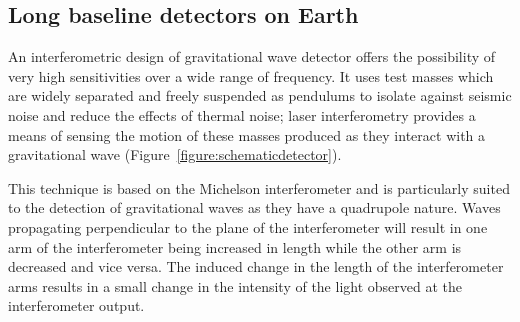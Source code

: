 \documentclass{article}
\begin{document}
\subsection{Long baseline detectors on Earth}
\label{subsection:earth}

An interferometric design of gravitational wave detector offers the possibility
of very high sensitivities over a wide range of frequency. It uses test masses
which are widely separated and freely suspended as pendulums to isolate against
seismic noise and reduce the effects of thermal noise; laser interferometry
provides a means of sensing the motion of these masses produced as they interact
with a gravitational wave (Figure~\ref{figure:schematicdetector}).


This technique is based on the Michelson interferometer and is particularly
suited to the detection of gravitational waves as they have a quadrupole nature.
Waves propagating perpendicular to the plane of the interferometer will result
in one arm of the interferometer being increased in length while the other arm
is decreased and vice versa. The induced change in the length of the
interferometer arms results in a small change in the intensity of the light
observed at the interferometer output.
\end{document}
